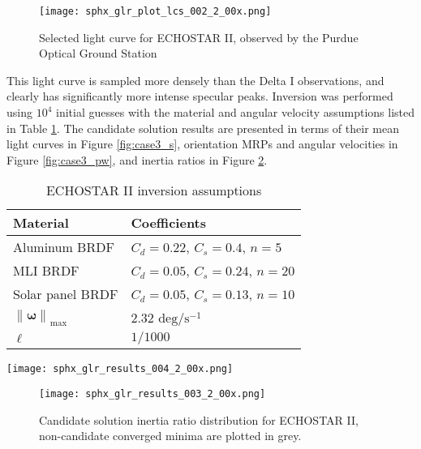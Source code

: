 \documentclass[a4paper,twocolumn]{spaceDebrisC} %
\newcommand{\vctr}[1]{\bm{#1}}
\newcommand{\norm}[1]{\left\lVert#1\right\rVert}
\newcommand{\figbig}[0]{0.5\textwidth}
\newcommand{\figmed}[0]{0.4\textwidth}
\begin{document}
\begin{figure}[H]
  \centering
  \texttt{[image: sphx\_glr\_plot\_lcs\_002\_2\_00x.png]}
  \caption{Selected light curve for ECHOSTAR II, observed by the Purdue Optical Ground Station}
  \label{fig:sat_lc_obs}
\end{figure}

This light curve is sampled more densely than the Delta I observations, and clearly has significantly more intense specular peaks. Inversion was performed using $10^4$ initial guesses with the material and angular velocity assumptions listed in Table \ref{tb:case3_ass}. The candidate solution results are presented in terms of their mean light curves in Figure \ref{fig:case3_s}, orientation MRPs and angular velocities in Figure \ref{fig:case3_pw}, and inertia ratios in Figure \ref{fig:case3_i}.

\begin{table}[H]
  \centering
  \caption{ECHOSTAR II inversion assumptions}
  \vspace*{6pt}
  \begin{tabular}{|l|l|}
  \hline
  \textbf{Material} & \textbf{Coefficients} \\ \hline
 Aluminum BRDF & $C_d=0.22$, $C_s=0.4$, $n=5$ \\ \hline
 MLI BRDF & $C_d=0.05$, $C_s=0.24$, $n=20$ \\ \hline
 Solar panel BRDF & $C_d=0.05$, $C_s=0.13$, $n=10$ \\ \hline
  $\norm{\vctr{\omega}}_\text{max}$ & $2.32$ $\text{deg} / \text{s}^{-1}$ \\ \hline
  $\ell$ & $1/1000$ \\ \hline
  \end{tabular}
  \label{tb:case3_ass}
\end{table}

\begin{figure*}[t]
  \centering
  \texttt{[image: sphx\_glr\_results\_004\_2\_00x.png]}
  \caption{Candidate solution inertia light curves compared to the real measurements in ADU for ECHOSTAR II.}
  \label{fig:case3_s}
\end{figure*}

\begin{figure}[H]
  \centering
  \texttt{[image: sphx\_glr\_results\_003\_2\_00x.png]}
  \caption{Candidate solution inertia ratio distribution for ECHOSTAR II, non-candidate converged minima are plotted in grey.}
  \label{fig:case3_i}
\end{figure}
\end{document}
